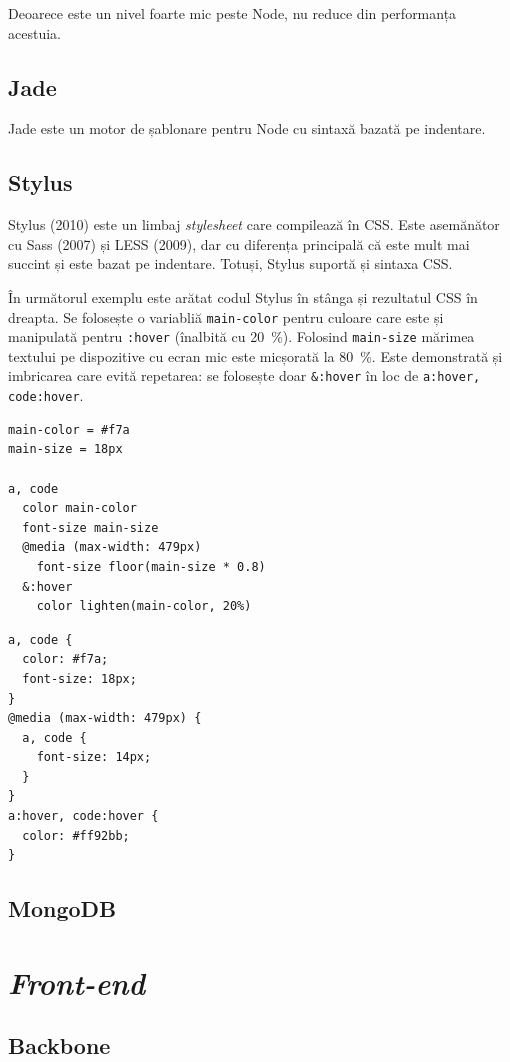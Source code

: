 \documentclass[a4wide,12pt]{report}
\newcommand{\eng}[1]{\emph{#1}} %
\newcommand{\cod}[1]{\texttt{#1}}
\begin{document}
Deoarece este un nivel foarte mic peste Node, nu reduce din performanța
acestuia.

\subsection{Jade}

Jade este un motor de șablonare pentru Node cu sintaxă bazată pe indentare.

\subsection{Stylus}

Stylus (2010) este un limbaj \eng{stylesheet} care compilează în CSS. Este
asemănător cu Sass (2007) și LESS (2009), dar cu diferența principală că este
mult mai succint și este bazat pe indentare. Totuși, Stylus suportă și sintaxa
CSS.

În următorul exemplu este arătat codul Stylus în stânga și rezultatul CSS în
dreapta. Se folosește o variabliă \cod{main-color} pentru culoare care este și
manipulată pentru \cod{:hover} (înalbită cu 20~\%). Folosind \cod{main-size}
mărimea textului pe dispozitive cu ecran mic este micșorată la 80~\%. Este
demonstrată și imbricarea care evită repetarea: se folosește doar \cod{\&:hover}
în loc de \cod{a:hover, code:hover}.

\minipage{9cm}
\begin{verbatim}
main-color = #f7a
main-size = 18px

a, code
  color main-color
  font-size main-size
  @media (max-width: 479px)
    font-size floor(main-size * 0.8)
  &:hover
    color lighten(main-color, 20%)
\end{verbatim}
\endminipage
\minipage{4cm}
\begin{verbatim}
a, code {
  color: #f7a;
  font-size: 18px;
}
@media (max-width: 479px) {
  a, code {
    font-size: 14px;
  }
}
a:hover, code:hover {
  color: #ff92bb;
}
\end{verbatim}
\endminipage

\subsection{MongoDB}

\section{\eng{Front-end}}

\subsection{Backbone}
\end{document}
